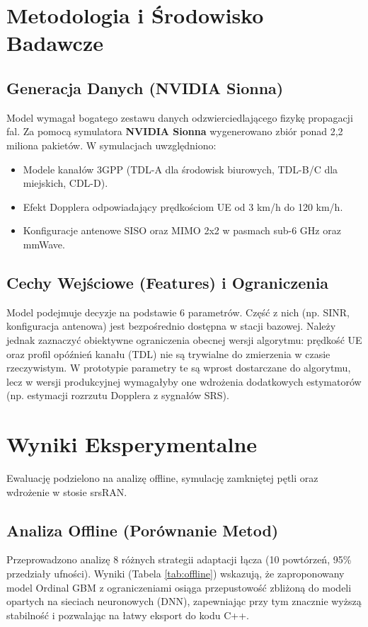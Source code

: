 \documentclass[11pt,a4paper]{article}
\begin{document}
\section{Metodologia i Środowisko Badawcze}

\subsection{Generacja Danych (NVIDIA Sionna)}
Model wymagał bogatego zestawu danych odzwierciedlającego fizykę propagacji fal. Za pomocą symulatora \textbf{NVIDIA Sionna} wygenerowano zbiór ponad 2,2 miliona pakietów. W symulacjach uwzględniono:
\begin{itemize}
    \item Modele kanałów 3GPP (TDL-A dla środowisk biurowych, TDL-B/C dla miejskich, CDL-D).
    \item Efekt Dopplera odpowiadający prędkościom UE od 3 km/h do 120 km/h.
    \item Konfiguracje antenowe SISO oraz MIMO 2x2 w pasmach sub-6 GHz oraz mmWave.
\end{itemize}

\subsection{Cechy Wejściowe (Features) i Ograniczenia}
Model podejmuje decyzje na podstawie 6 parametrów. Część z nich (np. SINR, konfiguracja antenowa) jest bezpośrednio dostępna w stacji bazowej. Należy jednak zaznaczyć obiektywne ograniczenia obecnej wersji algorytmu: prędkość UE oraz profil opóźnień kanału (TDL) nie są trywialne do zmierzenia w czasie rzeczywistym. W prototypie parametry te są wprost dostarczane do algorytmu, lecz w wersji produkcyjnej wymagałyby one wdrożenia dodatkowych estymatorów (np. estymacji rozrzutu Dopplera z sygnałów SRS).

\section{Wyniki Eksperymentalne}

Ewaluację podzielono na analizę offline, symulację zamkniętej pętli oraz wdrożenie w stosie srsRAN.

\subsection{Analiza Offline (Porównanie Metod)}
Przeprowadzono analizę 8 różnych strategii adaptacji łącza (10 powtórzeń, 95\% przedziały ufności). Wyniki (Tabela \ref{tab:offline}) wskazują, że zaproponowany model Ordinal GBM z ograniczeniami osiąga przepustowość zbliżoną do modeli opartych na sieciach neuronowych (DNN), zapewniając przy tym znacznie wyższą stabilność i pozwalając na łatwy eksport do kodu C++.
\end{document}
